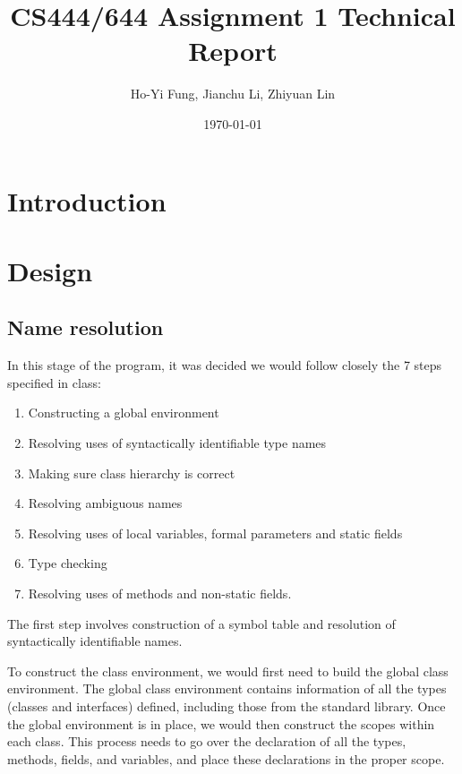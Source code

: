 \documentclass[a4paper, notitlepage]{report}
\title{CS444/644 Assignment 1 Technical Report}
\author{Ho-Yi Fung, Jianchu Li, Zhiyuan Lin}
\date{\today}
\begin{document}
{\let\newpage\relax\maketitle}
\begin{abstract}

\end{abstract}


\tableofcontents



\chapter{Introduction}

\chapter{Design}

\section{Name resolution}

In this stage of the program, it was decided we would follow closely the 7 steps specified in class:
\begin{enumerate}
	\item Constructing a global environment
	\item Resolving uses of syntactically identifiable type names
	\item Making sure class hierarchy is correct
	\item Resolving ambiguous names
	\item Resolving uses of local variables, formal parameters and static fields
	\item Type checking
	\item Resolving uses of methods and non-static fields.
\end{enumerate}

The first step involves construction of a symbol table and resolution of syntactically identifiable names.

To construct the class environment, we would first need to build the global class environment. The global class environment contains information of all the types (classes and interfaces) defined, including those from the standard library. Once the global environment is in place, we would then construct the scopes within each class. This process  needs to go over the declaration of all the types, methods, fields, and variables, and place these declarations in the proper scope.
\end{document}

